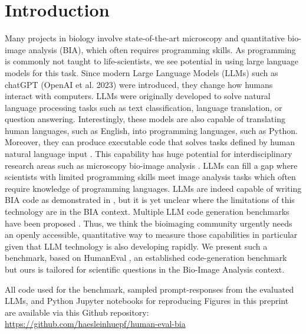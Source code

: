 \documentclass{ecai}
\begin{document}

\section{Introduction}

Many projects in biology involve state-of-the-art microscopy and  quantitative bio-image analysis (BIA), which often requires programming skills. As programming is commonly not taught to life-scientists, we see potential in using large language models for this task. Since modern Large Language Models (LLMs) such as chatGPT (OpenAI et al. 2023) were introduced, they change how humans interact with computers. LLMs were originally developed to solve  natural language processing tasks such as  text classification, language translation, or question answering. Interestingly, these models  are also capable of translating human languages, such as English, into programming languages, such as Python. Moreover, they can produce executable code that solves tasks defined by human natural language input \citep{brown2020language}. This capability has huge potential for interdisciplinary research areas such as microscopy bio-image analysis \citep{Royer2023}. LLMs can fill a gap where scientists with limited programming skills meet image analysis tasks which often require knowledge of programming languages. LLMs are indeed capable of writing BIA code as demonstrated in \citep{royer2023omega}, but it is yet unclear where the limitations of this technology are in the BIA context. Multiple LLM code generation benchmarks have been proposed \citep{chen2021evaluating,austin2021,lai2022ds1000,yadav2024pythonsaga,hendrycks2021measuring}. Thus, we think the bioimaging community urgently needs an openly accessible, quantitative way to measure those capabilities in particular given that LLM technology is also developing rapidly. We present such a benchmark, based on HumanEval \citep{chen2021evaluating}, an established code-generation benchmark but ours is tailored for scientific questions in the Bio-Image Analysis context.

\begin{blind}
All code used for the benchmark, sampled prompt-responses from the evaluated LLMs, and Python Jupyter notebooks for reproducing Figures in this preprint are available via this Github repository:
   \url{https://github.com/haesleinhuepf/human-eval-bia}
\end{blind}
\end{document}

